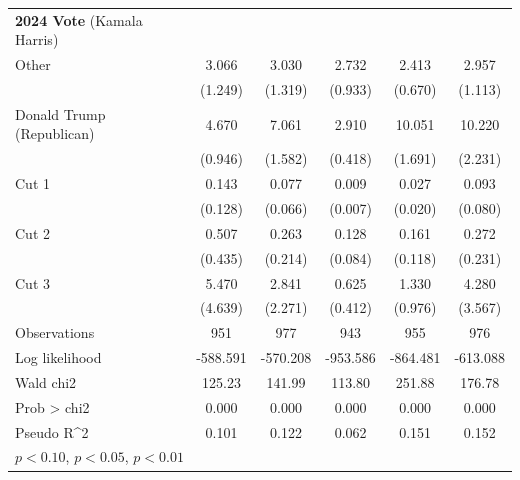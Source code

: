 \begin{table}[htbp]
\begin{tabular}{l*{5}{c}}
\textbf{2024 Vote} (Kamala Harris) &  &  &  &   & \\
Other              &       3.066\sym{***}&       3.030\sym{**} &       2.732\sym{***}&       2.413\sym{***}&       2.957\sym{***}\\
                    &     (1.249)         &     (1.319)         &     (0.933)         &     (0.670)         &     (1.113)         \\

Donald Trump (Republican)&       4.670\sym{***}&       7.061\sym{***}&       2.910\sym{***}&      10.051\sym{***}&      10.220\sym{***}\\
                    &     (0.946)         &     (1.582)         &     (0.418)         &     (1.691)         &     (2.231)         \\
Cut 1               &       0.143\sym{**} &       0.077\sym{***}&       0.009\sym{***}&       0.027\sym{***}&       0.093\sym{***}\\
                    &     (0.128)         &     (0.066)         &     (0.007)         &     (0.020)         &     (0.080)         \\
Cut 2               &       0.507         &       0.263         &       0.128\sym{***}&       0.161\sym{**} &       0.272         \\
                    &     (0.435)         &     (0.214)         &     (0.084)         &     (0.118)         &     (0.231)         \\
Cut 3               &       5.470\sym{**} &       2.841         &       0.625         &       1.330         &       4.280\sym{*}  \\
                    &     (4.639)         &     (2.271)         &     (0.412)         &     (0.976)         &     (3.567)         \\
\hline
Observations        &         951         &         977         &         943         &         955         &         976         \\
Log likelihood      &    -588.591         &    -570.208         &    -953.586         &    -864.481         &    -613.088         \\
Wald chi2           &      125.23         &      141.99         &      113.80         &      251.88         &      176.78         \\
Prob > chi2         &       0.000         &       0.000         &       0.000         &       0.000         &       0.000         \\
Pseudo R^2          &       0.101         &       0.122         &       0.062         &       0.151         &       0.152         \\
\hline\hline
\multicolumn{7}{l}{\footnotesize \sym{*} \(p<0.10\), \sym{**} \(p<0.05\), \sym{***} \(p<0.01\)}\\


\end{tabular}
\end{table}
